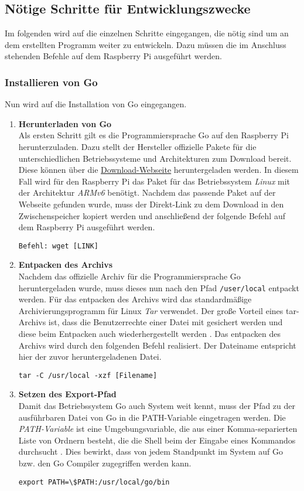 \subsection{Nötige Schritte für Entwicklungszwecke}
Im folgenden wird auf die einzelnen Schritte eingegangen, die nötig sind um an dem erstellten Programm weiter zu entwickeln. Dazu müssen die im Anschluss stehenden Befehle auf dem Raspberry Pi ausgeführt werden.
\subsubsection{Installieren von Go}
Nun wird auf die Installation von Go eingegangen.
\begin{enumerate}
\item \textbf{Herunterladen von Go}  \\
Als ersten Schritt gilt es die Programmiersprache Go auf den Raspberry Pi herunterzuladen. Dazu stellt der Hersteller offizielle Pakete für die unterschiedlichen Betriebssysteme und Architekturen zum Download bereit. Diese können über die \href{https://golang.org/dl/}{Download-Webseite} heruntergeladen werden. In diesem Fall wird für den Raspberry Pi das Paket für das Betriebssystem \textit{Linux} mit der Architektur \textit{ARMv6} benötigt. Nachdem das passende Paket auf der Webseite gefunden wurde, muss der Direkt-Link zu dem Download in den Zwischenspeicher kopiert werden und anschließend der folgende Befehl auf dem Raspberry Pi ausgeführt werden.
\begin{lstlisting}
Befehl: wget [LINK]
\end{lstlisting}

\item \textbf{Entpacken des Archivs}  \\
Nachdem das offizielle Archiv für die Programmiersprache Go heruntergeladen wurde, muss dieses nun nach den Pfad \verb|/user/local| entpackt werden. Für das entpacken des Archivs wird das standardmäßige Archivierungsprogramm für Linux \textit{\ac{Tar}} verwendet. Der große Vorteil eines tar-Archivs ist, dass die Benutzerrechte einer Datei mit gesichert werden und diese beim Entpacken auch wiederhergestellt werden \autocite{tar-wiki_2019}. Das entpacken des Archivs wird durch den folgenden Befehl realisiert. Der Dateiname entspricht hier der zuvor heruntergeladenen Datei.
\begin{lstlisting}
tar -C /usr/local -xzf [Filename]
\end{lstlisting}

\item \textbf{Setzen des Export-Pfad} \\
Damit das Betriebssystem Go auch System weit kennt, muss der Pfad zu der ausführbaren Datei von Go in die PATH-Variable eingetragen werden. Die \textit{PATH-Variable} ist eine Umgebungsvariable, die aus einer Komma-separierten Liste von Ordnern besteht, die die Shell beim der Eingabe eines Kommandos durchsucht \autocite{quigley_2000}. Dies bewirkt, dass von jedem Standpunkt im System auf Go bzw. den Go Compiler zugegriffen werden kann.
\begin{lstlisting}
export PATH=\$PATH:/usr/local/go/bin
\end{lstlisting}


\end{enumerate}
